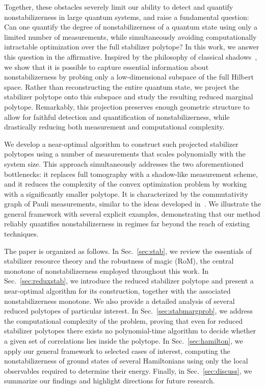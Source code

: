 \documentclass[10pt,aps,pra,twocolumn,floatfix,nofootinbib,superscriptaddress,longbibliography]{revtex4-2}
\newcommand{\1}{\mathbbm{1}}
\begin{document}
Together, these obstacles severely limit our ability to detect and quantify nonstabilizerness in large quantum systems, and raise a fundamental question: Can one quantify the degree of nonstabilizerness of a quantum state using only a limited number of measurements, while simultaneously avoiding computationally intractable optimization over the full stabilizer polytope? In this work, we answer this question in the affirmative. Inspired by the philosophy of classical shadows~\cite{huang2020predicting}, we show that it is possible to capture essential information about nonstabilizerness by probing only a low-dimensional subspace of the full Hilbert space. Rather than reconstructing the entire quantum state, we project the stabilizer polytope onto this subspace and study the resulting reduced marginal polytope. Remarkably, this projection preserves enough geometric structure to allow for faithful detection and quantification of nonstabilizerness, while drastically reducing both measurement and computational complexity.

We develop a near-optimal algorithm to construct such projected stabilizer polytopes using a number of measurements that scales polynomially with the system size. This approach simultaneously addresses the two aforementioned bottlenecks: it replaces full tomography with a shadow-like measurement scheme, and it reduces the complexity of the convex optimization problem by working with a significantly smaller polytope. It is characterized by the commutativity graph of Pauli measurements, similar to the ideas developed in~\cite{gokhale2019minimizing,chapman2020characterization,mann2025graph,xu2025simultaneous}. We illustrate the general framework with several explicit examples, demonstrating that our method reliably quantifies nonstabilizerness in regimes far beyond the reach of existing techniques.

The paper is organized as follows. In Sec.~\ref{sec:stab}, we review the essentials of stabilizer resource theory and the robustness of magic (RoM), the central monotone of nonstabilizerness employed throughout this work. In Sec.~\ref{sec:reduxstab}, we introduce the reduced stabilizer polytope and present a near-optimal algorithm for its construction, together with the associated nonstabilizerness monotone. We also provide a detailed analysis of several reduced polytopes of particular interest. In Sec.~\ref{sec:stabmargprob}, we address the computational complexity of the problem, proving that even for reduced stabilizer polytopes there exists no polynomial-time algorithm to decide whether a given set of correlations lies inside the polytope. In Sec.~\ref{sec:hamilton}, we apply our general framework to selected cases of interest, computing the nonstabilizerness of ground states of several Hamiltonians using only the local observables required to determine their energy. Finally, in Sec.~\ref{sec:discuss}, we summarize our findings and highlight directions for future research.
\end{document}
